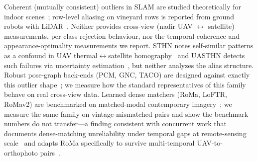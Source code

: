 \documentclass[journal]{IEEEtran}
\begin{document}
Coherent (mutually consistent) outliers in SLAM are studied theoretically for indoor scenes~\cite{lajoie2019}; row-level aliasing on vineyard rows is reported from ground robots with LiDAR~\cite{desilva2026,desilva2025,tempovine}. Neither provides cross-view (nadir UAV $\leftrightarrow$ satellite) measurements, per-class rejection behaviour, nor the temporal-coherence and appearance-optimality measurements we report. STHN notes self-similar patterns as a confound in UAV thermal$\leftrightarrow$satellite homography~\cite{sthn} and UASTHN detects such failures via uncertainty estimation~\cite{uasthn}, but neither analyzes the alias structure. Robust pose-graph back-ends (PCM, GNC, TACO) are designed against exactly this outlier shape~\cite{mangelson2018,kimera,yang2020,taco}; we measure how the standard representatives of this family behave on real cross-view data. Learned dense matchers (RoMa, LoFTR, RoMav2) are benchmarked on matched-modal contemporary imagery~\cite{xianvisloc}; we measure the same family on vintage-mismatched pairs and show the benchmark numbers do not transfer---a finding consistent with concurrent work that documents dense-matching unreliability under temporal gaps at remote-sensing scale~\cite{loretta} and adapts RoMa specifically to survive multi-temporal UAV-to-orthophoto pairs~\cite{satroma}.
\end{document}
